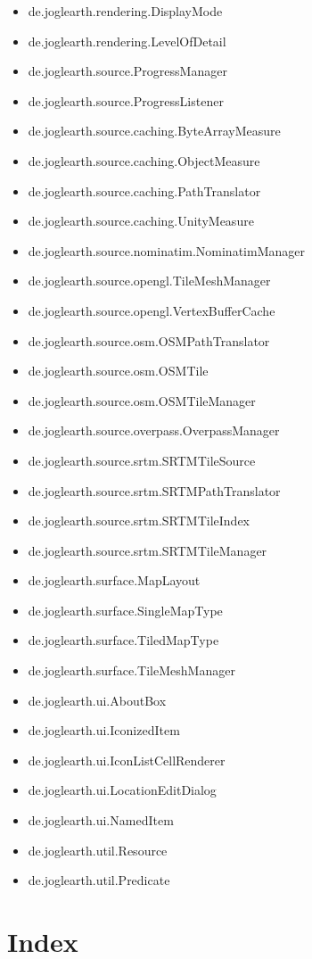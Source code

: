 \documentclass[10pt]{scrreprt}
\renewcommand{\bf}{\sffamily\bfseries}
\begin{document}
\begin{itemize}
\item de.joglearth.rendering.DisplayMode
\item de.joglearth.rendering.LevelOfDetail
\item de.joglearth.source.ProgressManager
\item de.joglearth.source.ProgressListener
\item de.joglearth.source.caching.ByteArrayMeasure
\item de.joglearth.source.caching.ObjectMeasure
\item de.joglearth.source.caching.PathTranslator
\item de.joglearth.source.caching.UnityMeasure
\item de.joglearth.source.nominatim.NominatimManager
\item de.joglearth.source.opengl.TileMeshManager
\item de.joglearth.source.opengl.VertexBufferCache
\item de.joglearth.source.osm.OSMPathTranslator
\item de.joglearth.source.osm.OSMTile
\item de.joglearth.source.osm.OSMTileManager
\item de.joglearth.source.overpass.OverpassManager
\item de.joglearth.source.srtm.SRTMTileSource
\item de.joglearth.source.srtm.SRTMPathTranslator
\item de.joglearth.source.srtm.SRTMTileIndex
\item de.joglearth.source.srtm.SRTMTileManager
\item de.joglearth.surface.MapLayout
\item de.joglearth.surface.SingleMapType
\item de.joglearth.surface.TiledMapType
\item de.joglearth.surface.TileMeshManager
\item de.joglearth.ui.AboutBox
\item de.joglearth.ui.IconizedItem
\item de.joglearth.ui.IconListCellRenderer
\item de.joglearth.ui.LocationEditDialog
\item de.joglearth.ui.NamedItem
\item de.joglearth.util.Resource
\item de.joglearth.util.Predicate
\end{itemize}

\chapter*{Index}
\let\oldbf\bf
\renewcommand{\bf}{}
\let\bf\oldbf

\end{document}
